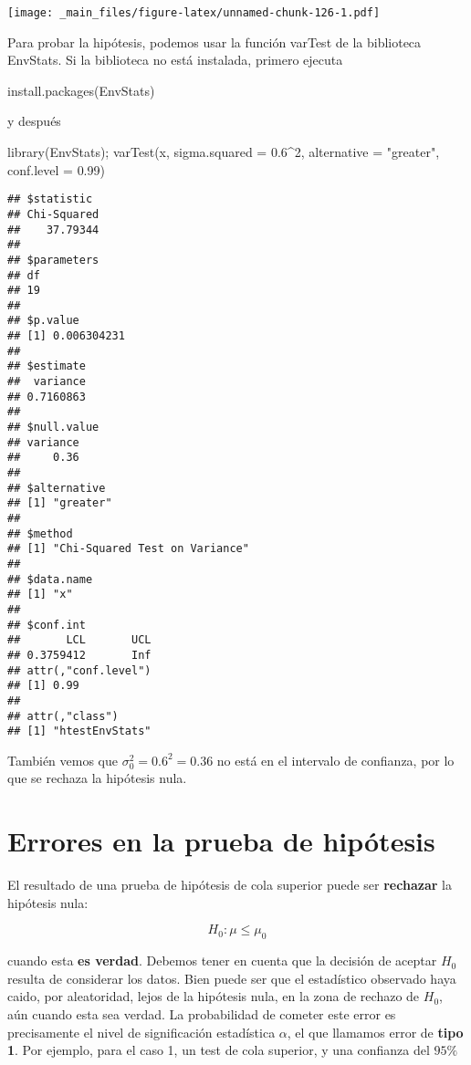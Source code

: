 \documentclass[
]{book}
\newenvironment{Shaded}{\begin{snugshade}}{\end{snugshade}}
\newcommand{\AttributeTok}[1]{\textcolor[rgb]{0.77,0.63,0.00}{#1}}
\newcommand{\DecValTok}[1]{\textcolor[rgb]{0.00,0.00,0.81}{#1}}
\newcommand{\FloatTok}[1]{\textcolor[rgb]{0.00,0.00,0.81}{#1}}
\newcommand{\FunctionTok}[1]{\textcolor[rgb]{0.00,0.00,0.00}{#1}}
\newcommand{\NormalTok}[1]{#1}
\newcommand{\SpecialCharTok}[1]{\textcolor[rgb]{0.00,0.00,0.00}{#1}}
\newcommand{\StringTok}[1]{\textcolor[rgb]{0.31,0.60,0.02}{#1}}
\begin{document}
\texttt{[image: \_main\_files/figure-latex/unnamed-chunk-126-1.pdf]}

Para probar la hipótesis, podemos usar la función varTest de la biblioteca EnvStats. Si la biblioteca no está instalada, primero ejecuta

\begin{Shaded}
\begin{Highlighting}[]
\FunctionTok{install.packages}\NormalTok{(EnvStats)}
\end{Highlighting}
\end{Shaded}

y después

\begin{Shaded}
\begin{Highlighting}[]
\FunctionTok{library}\NormalTok{(EnvStats);}
\FunctionTok{varTest}\NormalTok{(x, }\AttributeTok{sigma.squared =} \FloatTok{0.6}\SpecialCharTok{\^{}}\DecValTok{2}\NormalTok{, }\AttributeTok{alternative =} \StringTok{"greater"}\NormalTok{, }\AttributeTok{conf.level =} \FloatTok{0.99}\NormalTok{) }
\end{Highlighting}
\end{Shaded}

\begin{verbatim}
## $statistic
## Chi-Squared 
##    37.79344 
## 
## $parameters
## df 
## 19 
## 
## $p.value
## [1] 0.006304231
## 
## $estimate
##  variance 
## 0.7160863 
## 
## $null.value
## variance 
##     0.36 
## 
## $alternative
## [1] "greater"
## 
## $method
## [1] "Chi-Squared Test on Variance"
## 
## $data.name
## [1] "x"
## 
## $conf.int
##       LCL       UCL 
## 0.3759412       Inf 
## attr(,"conf.level")
## [1] 0.99
## 
## attr(,"class")
## [1] "htestEnvStats"
\end{verbatim}

También vemos que \(\sigma_0^2=0.6^2=0.36\) no está en el intervalo de confianza, por lo que se rechaza la hipótesis nula.

\hypertarget{errores-en-la-prueba-de-hipuxf3tesis}{%
\section{Errores en la prueba de hipótesis}\label{errores-en-la-prueba-de-hipuxf3tesis}}

El resultado de una prueba de hipótesis de cola superior puede ser \textbf{rechazar} la hipótesis nula:

\[H_0: \mu\leq\mu_0\]

cuando esta \textbf{es verdad}. Debemos tener en cuenta que la decisión de aceptar \(H_0\) resulta de considerar los datos. Bien puede ser que el estadístico observado haya caido, por aleatoridad, lejos de la hipótesis nula, en la zona de rechazo de \(H_0\), aún cuando esta sea verdad. La probabilidad de cometer este error es precisamente el nivel de significación estadística \(\alpha\), el que llamamos error de \textbf{tipo 1}. Por ejemplo, para el caso 1, un test de cola superior, y una confianza del \(95\%\)
\end{document}

